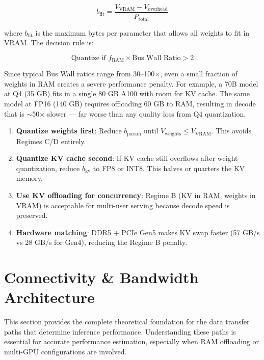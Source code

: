 \documentclass[11pt,a4paper]{article}
\theoremstyle{definition}
\begin{document}
\begin{equation}\label{eq:quant_threshold}
b_{\text{fit}} = \frac{V_{\text{VRAM}} - V_{\text{overhead}}}{P_{\text{total}}}
\end{equation}

where $b_{\text{fit}}$ is the maximum bytes per parameter that allows all weights to fit in VRAM. The decision rule is:

\begin{equation}\label{eq:quant_decision}
\text{Quantize if } f_{\text{RAM}} \times \text{Bus Wall Ratio} > 2
\end{equation}

Since typical Bus Wall ratios range from 30--100$\times$, even a small fraction of weights in RAM creates a severe performance penalty. For example, a 70B model at Q4 (35 GB) fits in a single 80 GB A100 with room for KV cache. The same model at FP16 (140 GB) requires offloading 60 GB to RAM, resulting in decode that is $\sim$50$\times$ slower --- far worse than any quality loss from Q4 quantization.

\begin{warnbox}
\begin{enumerate}
  \item \textbf{Quantize weights first}: Reduce $b_{\text{param}}$ until $V_{\text{weights}} \leq V_{\text{VRAM}}$. This avoids Regimes C/D entirely.
  \item \textbf{Quantize KV cache second}: If KV cache still overflows after weight quantization, reduce $b_{\text{kv}}$ to FP8 or INT8. This halves or quarters the KV memory.
  \item \textbf{Use KV offloading for concurrency}: Regime B (KV in RAM, weights in VRAM) is acceptable for multi-user serving because decode speed is preserved.
  \item \textbf{Hardware matching}: DDR5 + PCIe Gen5 makes KV swap faster (57 GB/s vs 28 GB/s for Gen4), reducing the Regime B penalty.
\end{enumerate}
\end{warnbox}

\section{Connectivity \& Bandwidth Architecture}

This section provides the complete theoretical foundation for the data transfer paths that determine inference performance. Understanding these paths is essential for accurate performance estimation, especially when RAM offloading or multi-GPU configurations are involved.
\end{document}
